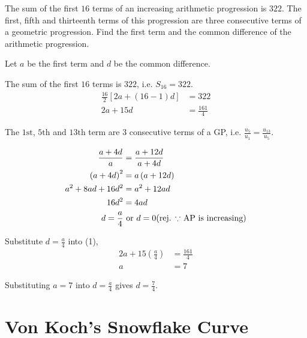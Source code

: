 \documentclass[11pt,a4paper]{book}
\begin{document}
\begin{example}

The sum of the first $16$ terms of an increasing arithmetic progression
is $322$. The first, fifth and thirteenth terms of this progression
are three consecutive terms of a geometric progression. Find the first
term and the common difference of the arithmetic progression.

\Solution

Let $a$ be the first term and $d$ be the common difference.

The sum of the first $16$ terms is $322$, i.e. $S_{16}=322$.
\begin{align*}
\frac{16}{2}\left[2a+\left(16-1\right)d\right] & =322\\
2a+15d & =\frac{161}{4}\tag{1}
\end{align*}

The $1\text{st}$, $5\text{th}$ and $13\text{th}$ term are 3 consecutive
terms of a GP, i.e. ${\displaystyle \frac{u_{5}}{u_{1}}=\frac{u_{13}}{u_{5}}}$.

\begin{align*}
\frac{a+4d}{a} & =\frac{a+12d}{a+4d}\\
\left(a+4d\right)^{2} & =a\left(a+12d\right)\\
a^{2}+8ad+16d^{2} & =a^{2}+12ad\\
16d^{2} & =4ad\\
d=\frac{a}{4} & \text{ or }d=0\text{(rej. \ensuremath{\because} AP is increasing)}
\end{align*}

Substitute ${\displaystyle d=\frac{a}{4}}$ into (1),
\begin{align*}
2a+15\left(\frac{a}{4}\right) & =\frac{161}{4}\\
a & =7
\end{align*}

Substituting $a=7$ into ${\displaystyle d=\frac{a}{4}}$ gives ${\displaystyle d=\frac{7}{4}}$.

\end{example}

\newpage


\section{Von Koch's Snowflake Curve}
\end{document}
